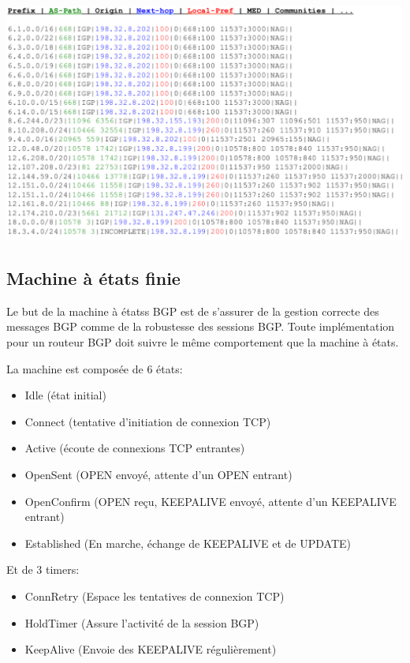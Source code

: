 \documentclass{article}
\begin{document}
\begin{sffamily}
\includegraphics[width=\textwidth]{fab_002.pdf}

\subsection{Machine à états finie}

Le but de la machine à étatss BGP est de s'assurer de la gestion
correcte des messages BGP comme de la robustesse des sessions
BGP. Toute implémentation pour un routeur BGP doit suivre le même
comportement que la machine à états.

La machine est composée de 6 états:

\begin{itemize}
\item Idle (état initial)
\item Connect (tentative d'initiation de connexion TCP)
\item Active (écoute de connexions TCP entrantes)
\item OpenSent (OPEN envoyé, attente d'un OPEN entrant)
\item OpenConfirm (OPEN reçu, KEEPALIVE envoyé, attente d'un KEEPALIVE
  entrant)
\item Established (En marche, échange de KEEPALIVE et de UPDATE)
\end{itemize}

Et de 3 timers:

\begin{itemize}
\item ConnRetry (Espace les tentatives de connexion TCP)
\item HoldTimer (Assure l'activité de la session BGP)
\item KeepAlive (Envoie des KEEPALIVE régulièrement)
\end{itemize}


\end{sffamily}
\end{document}
